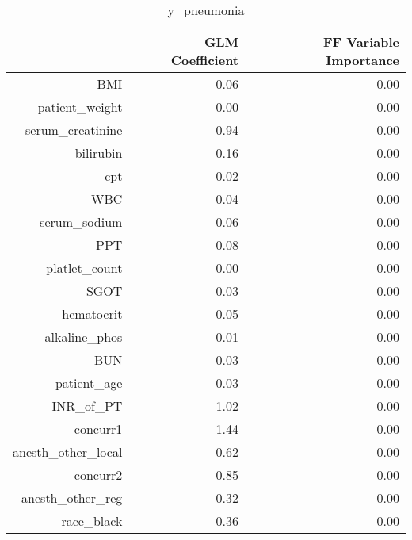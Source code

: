 \begin{table}[ht]
\centering
\begin{tabular}{rrr}
  \hline
 & GLM Coefficient & FF Variable Importance \\ 
  \hline
BMI & 0.06 & 0.00 \\ 
  patient\_weight & 0.00 & 0.00 \\ 
  serum\_creatinine & -0.94 & 0.00 \\ 
  bilirubin & -0.16 & 0.00 \\ 
  cpt & 0.02 & 0.00 \\ 
  WBC & 0.04 & 0.00 \\ 
  serum\_sodium & -0.06 & 0.00 \\ 
  PPT & 0.08 & 0.00 \\ 
  platlet\_count & -0.00 & 0.00 \\ 
  SGOT & -0.03 & 0.00 \\ 
  hematocrit & -0.05 & 0.00 \\ 
  alkaline\_phos & -0.01 & 0.00 \\ 
  BUN & 0.03 & 0.00 \\ 
  patient\_age & 0.03 & 0.00 \\ 
  INR\_of\_PT & 1.02 & 0.00 \\ 
  concurr1 & 1.44 & 0.00 \\ 
  anesth\_other\_local & -0.62 & 0.00 \\ 
  concurr2 & -0.85 & 0.00 \\ 
  anesth\_other\_reg & -0.32 & 0.00 \\ 
  race\_black & 0.36 & 0.00 \\ 
   \hline
\end{tabular}
\caption{y_pneumonia} 
\end{table}

